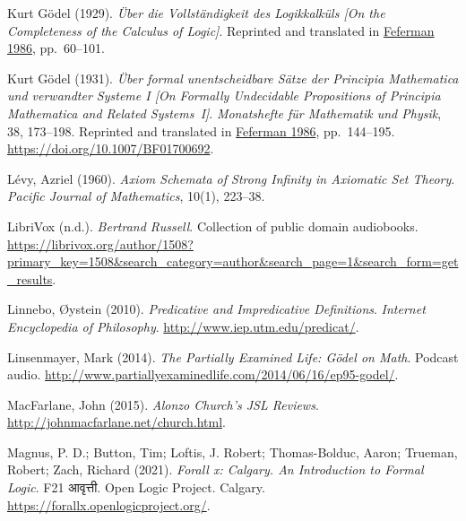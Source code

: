 \par\medskip{}\label{bib:Godel1929}
Kurt G\"odel (1929). \emph{{\"U}ber die {V}ollst\"andigkeit des {L}ogikkalk\"uls [{O}n the Completeness of the Calculus of Logic]}. Reprinted and translated in \hyperref[bib:Godel1986]{Feferman 1986}, pp.~60--101.

\par\medskip{}\label{bib:Godel1931}
Kurt G{\"{o}}del (1931). \emph{\"Uber formal unentscheidbare {S}\"atze der \emph{{P}rincipia {M}athematica} und verwandter {S}ysteme {I} [{O}n Formally Undecidable Propositions of \emph{{P}rincipia {M}athematica} and Related Systems~{I}]}. \emph{Monatshefte f\"ur Mathematik und Physik}, 38, 173--198. Reprinted and translated in \hyperref[bib:Godel1986]{Feferman 1986}, pp.~144--195. \url{https://doi.org/10.1007/BF01700692}.

\par\medskip{}\label{bib:Levy1960}
L\'{e}vy, Azriel (1960). \emph{Axiom Schemata of Strong Infinity in Axiomatic Set Theory}. \emph{Pacific Journal of Mathematics}, 10(1), 223--38.

\par\medskip{}\label{bib:LibriVoxND}
LibriVox (n.d.). \emph{Bertrand {R}ussell}. Collection of public domain audiobooks. \url{https://librivox.org/author/1508?primary_key=1508&search_category=author&search_page=1&search_form=get_results}.

\par\medskip{}\label{bib:Linnebo2010}
Linnebo, \O{}ystein (2010). \emph{Predicative and Impredicative Definitions}. \emph{Internet Encyclopedia of Philosophy}. \url{http://www.iep.utm.edu/predicat/}.

\par\medskip{}\label{bib:Linsenmayer2014}
Linsenmayer, Mark (2014). \emph{The Partially Examined Life: {G}\"odel on Math}. Podcast audio. \url{http://www.partiallyexaminedlife.com/2014/06/16/ep95-godel/}.

\par\medskip{}\label{bib:MacFarlane2015}
MacFarlane, John (2015). \emph{Alonzo {C}hurch's {JSL} Reviews}. \url{http://johnmacfarlane.net/church.html}.

\par\medskip{}\label{bib:Magnus2021}
Magnus, P. D.; Button, Tim; Loftis, J. Robert; {Thomas-Bolduc}, Aaron; Trueman, Robert; Zach, Richard (2021). \emph{Forall {\emph{x}}: {{Calgary}}. {{An}} Introduction to Formal Logic}. F21 आवृत्ती. {Open Logic Project}. {Calgary}. \url{https://forallx.openlogicproject.org/}.

